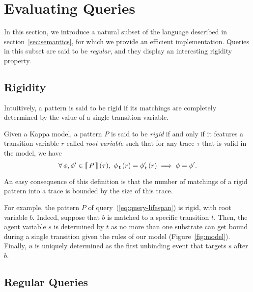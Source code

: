 \documentclass[runningheads]{llncs}
\begin{document}

 

\section{Evaluating Queries}

In this section, we introduce a natural subset of the language
described in section~\ref{sec:semantics}, for which we provide an
efficient implementation. Queries in this subset are said to be
\emph{regular}, and they display an interesting {rigidity}
property.

\subsection{Rigidity}

Intuitively, a pattern is said to be rigid if its matchings are
completely determined by the value of a single transition variable.
\begin{definition}\label{def:rigidity}
  Given a Kappa model, a pattern $P$ is said to be \emph{rigid} if and
  only if it features a transition variable $r$ called \emph{root
    variable} such that for any trace $\tau$ that is valid in the
  model, we have
  \[ \forall\, \phi, \phi' \in \Sem{P}(\tau), \ \phi_{\Tr}\,(r) =
    \phi'_{\Tr}\,(r) \implies \phi = \phi'. \]
\end{definition}
An easy consequence of this definition is that the number of matchings
of a rigid pattern into a trace is bounded by the size of this trace.


For example, the pattern $P$ of query~(\ref{eq:query-lifespan})
is rigid, with root variable $b$. Indeed, suppose that $b$ is matched
to a specific transition $t$. Then, the agent variable $s$ is
determined by $t$ as no more than one substrate can get bound during a
single transition given the rules of our model
(Figure~\ref{fig:model}). Finally, $u$ is uniquely determined as the
first unbinding event that targets $s$ after $b$.

\subsection{Regular Queries}
\end{document}
